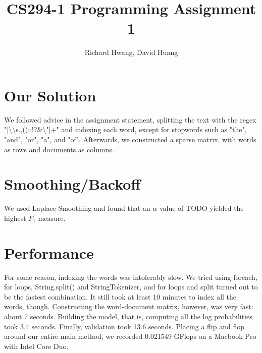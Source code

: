 \documentclass[11pt]{article}
\title{CS294-1 Programming Assignment 1}
\author{Richard Hwang, David Huang}
\begin{document}
\maketitle

\section{Our Solution}
We followed advice in the assignment statement, splitting the text with the regex "[\textbackslash \textbackslash s.,();:!?\&\textbackslash"]+" and indexing each word, except for stopwords such as "the", "and", "or", "a", and "of".  Afterwards, we constructed a sparse matrix, with words as rows and documents as columns.
\section{Smoothing/Backoff}
We used Laplace Smoothing and found that an $\alpha$ value of TODO yielded the highest $F_1$ measure.
\section{Performance}
For some reason, indexing the words was intolerably slow.  We tried using foreach, for loops, String.split() and StringTokenizer, and for loops and split turned out to be the fastest combination.  It still took at least 10 minutes to index all the words, though.  Constructing the word-document matrix, however, was very fast: about 7 seconds.  Building the model, that is, computing all the log probabilities took 3.4 seconds.  Finally, validation took 13.6 seconds.  Placing a flip and flop around our entire main method, we recorded 0.021549 GFlops on a Macbook Pro with Intel Core Duo.
\end{document}
